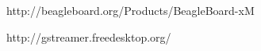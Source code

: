 \documentclass[%
	final,
	reprint,
	notitlepage,
	narroweqnarray,
	inline,
	twoside,
        invited,
	]{ieee}
\begin{document}
%
%
%
%
%

\begin{thebibliography}{1}

http://beagleboard.org/Products/BeagleBoard-xM

http://gstreamer.freedesktop.org/

\end{thebibliography}

\end{document}
